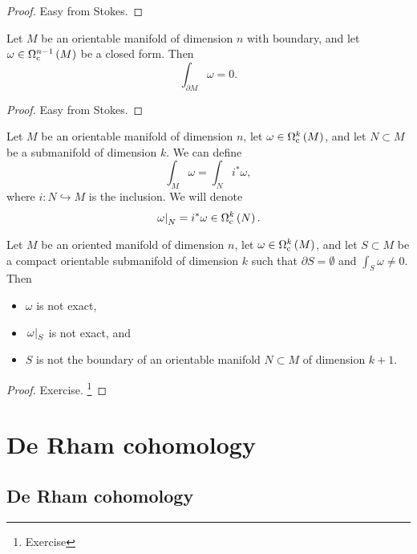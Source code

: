 \begin{proof}
Easy from Stokes.
\end{proof}

\begin{proposition}
Let $ M $ be an orientable manifold of dimension $ n $ with boundary, and let $ \omega \in \Omega_\c^{n - 1}\br{M} $ be a closed form. Then
$$ \int_{\partial M} \omega = 0. $$
\end{proposition}

\begin{proof}
Easy from Stokes.
\end{proof}

Let $ M $ be an orientable manifold of dimension $ n $, let $ \omega \in \Omega_\c^k\br{M} $, and let $ N \subset M $ be a submanifold of dimension $ k $. We can define
$$ \int_M \omega = \int_N i^*\omega, $$
where $ i : N \hookrightarrow M $ is the inclusion. We will denote
$$ \eval{\omega}_N = i^*\omega \in \Omega_\c^k\br{N}. $$

\begin{proposition}
Let $ M $ be an oriented manifold of dimension $ n $, let $ \omega \in \Omega_\c^k\br{M} $, and let $ S \subset M $ be a compact orientable submanifold of dimension $ k $ such that $ \partial S = \emptyset $ and $ \int_S \omega \ne 0 $. Then
\begin{itemize}
\item $ \omega $ is not exact,
\item $ \left. \omega \right|_S $ is not exact, and
\item $ S $ is not the boundary of an orientable manifold $ N \subset M $ of dimension $ k + 1 $.
\end{itemize}
\end{proposition}

\begin{proof}
Exercise. \footnote{Exercise}
\end{proof}

\pagebreak

\section{De Rham cohomology}

\subsection{De Rham cohomology}


